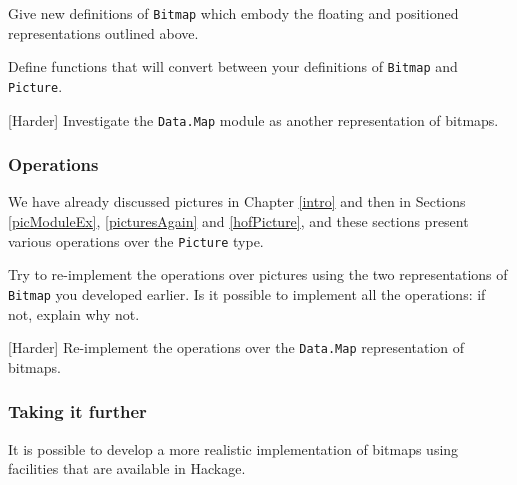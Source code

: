 \begin{exercises}

\item 
Give new definitions of \texttt{Bitmap} which embody the floating and positioned representations outlined above.

\item
Define functions that will convert between your definitions of \texttt{Bitmap} and \texttt{Picture}.

\item {[Harder]}
Investigate the \texttt{Data.Map} module as another representation of bitmaps.

\end{exercises}

\subsubsection*{Operations}

We have already discussed pictures in Chapter \ref{intro} and then in Sections \ref{picModuleEx}, \ref{picturesAgain} and \ref{hofPicture}, and these sections present various operations over the \texttt{Picture} type.

\begin{exercises}

\item 
Try to re-implement the operations over pictures using the two representations of \texttt{Bitmap} you developed earlier. Is it possible to implement all the operations: if not, explain why not.

\item {[Harder]}
Re-implement the operations over the \texttt{Data.Map} representation of bitmaps.

\end{exercises}



\subsubsection*{Taking it further} 

It is possible to develop a more realistic implementation of bitmaps using facilities that are available in Hackage.



